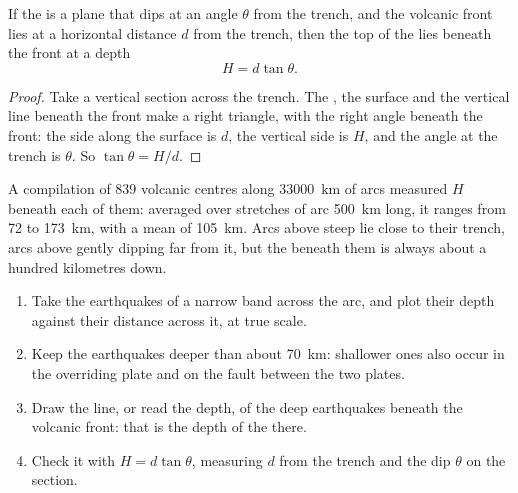 \begin{proposition}\label{prop:g12:subduction-magmatism:depth}
If the  is a plane that dips at an angle $\theta$ from the trench, and
the volcanic front lies at a horizontal distance $d$ from the trench, then
the top of the  lies beneath the front at a depth
\[
  H = d \tan\theta .
\]
\end{proposition}

\begin{proof}
Take a vertical section across the trench. The , the surface and the
vertical line beneath the front make a right triangle, with the right angle
beneath the front: the side along the surface is $d$, the vertical side is
$H$, and the angle at the trench is $\theta$. So $\tan\theta = H/d$.
\end{proof}

A compilation of 839 volcanic centres along \qty{33000}{km} of arcs measured
$H$ beneath each of them: averaged over stretches of arc \qty{500}{km} long,
it ranges from 72 to \qty{173}{km}, with a mean of \qty{105}{km}. Arcs above
steep  lie close to their trench, arcs above gently dipping  far
from it, but the  beneath them is always about a hundred kilometres
down.

\begin{method}\label{met:g12:subduction-magmatism:slab}
\begin{enumerate}
  \item Take the earthquakes of a narrow band across the arc, and plot their
        depth against their distance across it, at true scale.
  \item Keep the earthquakes deeper than about \qty{70}{km}: shallower ones
        also occur in the overriding plate and on the fault between the two
        plates.
  \item Draw the line, or read the depth, of the deep earthquakes beneath
        the volcanic front: that is the depth of the  there.
  \item Check it with $H = d\tan\theta$, measuring $d$ from the trench and
        the dip $\theta$ on the section.
\end{enumerate}
\end{method}

